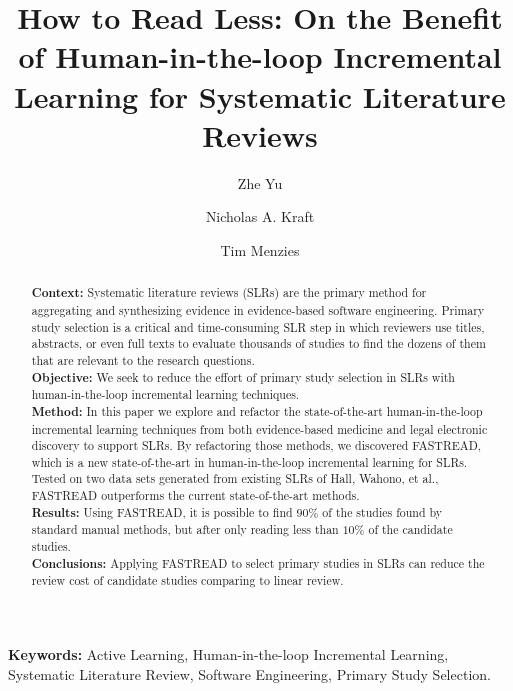 \documentclass[final,twocolumn,5p]{elsarticle}
\theoremstyle{break}
\begin{document}

\begin{frontmatter}
  \title{ How to Read Less: On the Benefit of Human-in-the-loop Incremental Learning for Systematic Literature Reviews}
 

\author[add1]{Zhe Yu}
\author[add2]{Nicholas A. Kraft}
\author[add1]{Tim Menzies}
\address[add1]{Department of Computer Science, North Carolina State University, Raleigh, NC, USA}
\address[add2]{ABB Corporate Research, Raleigh, NC, USA}


\begin{abstract}
  
\noindent\textbf{Context:} Systematic literature reviews (SLRs) are the primary method for aggregating and synthesizing evidence in evidence-based software engineering. Primary study selection is a critical and time-consuming SLR step in which reviewers use
titles, abstracts, or even full texts to evaluate thousands of studies to find
the dozens of them that are relevant to the research questions. \\
\textbf{Objective:} We seek to reduce the effort of primary study selection in SLRs with human-in-the-loop incremental learning techniques.\\
\textbf{Method:} In this paper we explore and refactor the state-of-the-art human-in-the-loop incremental learning techniques from both evidence-based medicine and legal electronic discovery to support SLRs. By refactoring those methods, we discovered FASTREAD, which is a new state-of-the-art in human-in-the-loop incremental learning for SLRs. Tested on two data sets generated from existing SLRs of Hall, Wahono, et al., FASTREAD outperforms the current state-of-the-art methods.\\
\textbf{Results:} Using FASTREAD, it is possible to find $90\%$ of the studies found by standard manual methods, but after only reading less than $10\%$ of the candidate studies. \\
\textbf{Conclusions:} Applying FASTREAD to select primary studies in SLRs can reduce the review cost of candidate studies comparing to linear review.

\end{abstract}
\end{frontmatter}


 
\vspace{1mm}
\noindent
{\bf Keywords:} Active Learning, Human-in-the-loop Incremental Learning, Systematic Literature Review, Software Engineering, Primary Study Selection.
\end{document}
